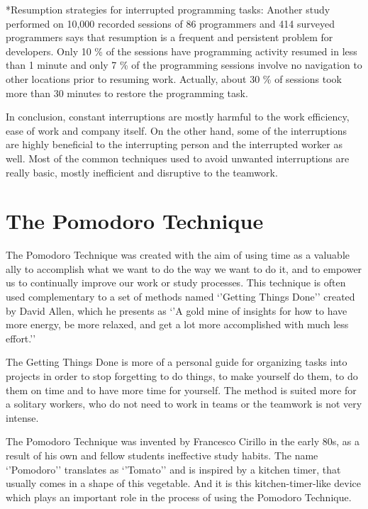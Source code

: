 \documentclass[11pt,singleside]{myfithesis2}
\makeatletter
\renewcommand\paragraph{
   \vspace{-10pt}
   \@startsection{paragraph}{4}{0mm}
      {\baselineskip}
      {- 5pt}
      {\normalfont\normalsize\bfseries}
}
\makeatother
\begin{document}
\paragraph*{Resumption strategies for interrupted programming tasks: } Another study \cite{studyResumptionStrategies} performed on 10,000 recorded sessions of 86 programmers and 414 surveyed programmers says that resumption is a frequent and persistent problem for developers. Only 10 \% of the sessions have programming activity resumed in less than 1 minute and only 7 \% of the programming sessions involve no navigation to other locations prior to resuming work. Actually, about 30 \% of sessions took more than 30 minutes to restore the programming task.

In conclusion, constant interruptions are mostly harmful to the work efficiency, ease of work and company itself. On the other hand, some of the interruptions are highly beneficial to the interrupting person and the interrupted worker as well. Most of the common techniques used to avoid unwanted interruptions are really basic, mostly inefficient and disruptive to the teamwork.

	\section{The Pomodoro Technique}
The Pomodoro Technique was created with the aim of using time as a valuable ally to accomplish what we want to do the way we want to do it, and to empower us to continually improve our work or study processes. \cite{pomodoro} This technique is often used complementary to a set of methods named `'Getting Things Done'' \cite{gtd} created by David Allen, which he presents as `'A gold mine of insights for how to have more energy, be more relaxed, and get a lot more accomplished with much less effort.''

The Getting Things Done is more of a personal guide for organizing tasks into projects in order to stop forgetting to do things, to make yourself do them, to do them on time and to have more time for yourself. The method is suited more for a solitary workers, who do not need to work in teams or the teamwork is not very intense.

The Pomodoro Technique was invented by Francesco Cirillo in the early 80s, as a result of his own and fellow students ineffective study habits. The name `'Pomodoro'' translates as `'Tomato'' and is inspired by a kitchen timer, that usually comes in a shape of this vegetable. And it is this kitchen-timer-like device which plays an important role in the process of using the Pomodoro Technique.
\end{document}
